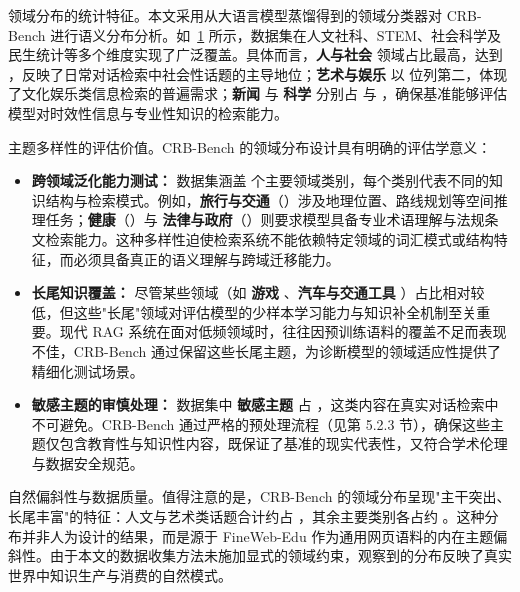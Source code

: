 \begin{figure}[h]
    \centering

    \label{fig:domain_distribution}
\end{figure}

领域分布的统计特征。本文采用从大语言模型蒸馏得到的领域分类器对 CRB-Bench 进行语义分布分析。如~\ref{fig:domain_distribution} 所示，数据集在人文社科、STEM、社会科学及民生统计等多个维度实现了广泛覆盖。具体而言，\textbf{人与社会} 领域占比最高，达到 \TBD{\%}，反映了日常对话检索中社会性话题的主导地位；\textbf{艺术与娱乐} 以 \TBD{\%} 位列第二，体现了文化娱乐类信息检索的普遍需求；\textbf{新闻} 与 \textbf{科学} 分别占 \TBD{\%} 与 \TBD{\%}，确保基准能够评估模型对时效性信息与专业性知识的检索能力。



主题多样性的评估价值。CRB-Bench 的领域分布设计具有明确的评估学意义：
\begin{itemize}
    \item \textbf{跨领域泛化能力测试：} 数据集涵盖  个主要领域类别，每个类别代表不同的知识结构与检索模式。例如，\textbf{旅行与交通}（\TBD{\%}）涉及地理位置、路线规划等空间推理任务；\textbf{健康}（\TBD{\%}）与 \textbf{法律与政府}（\TBD{\%}）则要求模型具备专业术语理解与法规条文检索能力。这种多样性迫使检索系统不能依赖特定领域的词汇模式或结构特征，而必须具备真正的语义理解与跨域迁移能力。
    
    \item \textbf{长尾知识覆盖：} 尽管某些领域（如 \textbf{游戏} \TBD{\%}、\textbf{汽车与交通工具} \TBD{\%}）占比相对较低，但这些"长尾"领域对评估模型的少样本学习能力与知识补全机制至关重要。现代 RAG 系统在面对低频领域时，往往因预训练语料的覆盖不足而表现不佳，CRB-Bench 通过保留这些长尾主题，为诊断模型的领域适应性提供了精细化测试场景。
    
    \item \textbf{敏感主题的审慎处理：} 数据集中 \textbf{敏感主题} 占 \TBD{\%}，这类内容在真实对话检索中不可避免。CRB-Bench 通过严格的预处理流程（见第 5.2.3 节），确保这些主题仅包含教育性与知识性内容，既保证了基准的现实代表性，又符合学术伦理与数据安全规范。
\end{itemize}

自然偏斜性与数据质量。值得注意的是，CRB-Bench 的领域分布呈现"主干突出、长尾丰富"的特征：人文与艺术类话题合计约占 \TBD{\%}，其余主要类别各占约 \TBD{\%}。这种分布并非人为设计的结果，而是源于 FineWeb-Edu 作为通用网页语料的内在主题偏斜性。由于本文的数据收集方法未施加显式的领域约束，观察到的分布反映了真实世界中知识生产与消费的自然模式。

